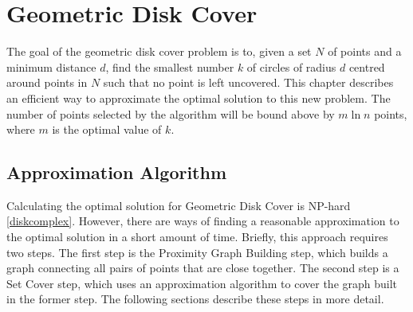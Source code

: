 \cleardoublepage
\chapter{Geometric Disk Cover}
\label{chap:approx}

The goal of the geometric disk cover problem is to, given a set $N$ of points and a minimum distance $d$, find the smallest number $k$ of circles of radius $d$ centred around points in $N$ such that no point is left uncovered. This chapter describes an efficient way to approximate the optimal solution to this new problem. The number of points selected by the algorithm will be bound above by $m \ln {n}$ points, where $m$ is the optimal value of $k$.

\section{Approximation Algorithm}
Calculating the optimal solution for Geometric Disk Cover is {NP-hard} \ref{diskcomplex}. However, there are ways of finding a reasonable approximation to the optimal solution in a short amount of time. Briefly, this approach requires two steps. The first step is the Proximity Graph Building step, which builds a graph connecting all pairs of points that are close together. The second step is a Set Cover step, which uses an approximation algorithm to cover the graph built in the former step. The following sections describe these steps in more detail.

